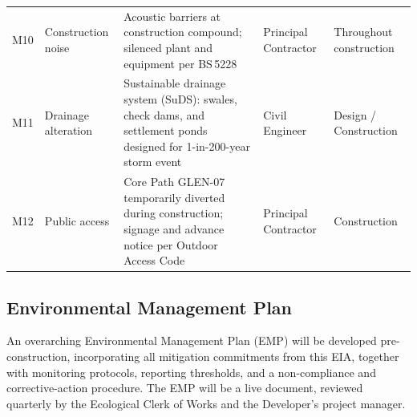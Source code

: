 \begin{tabularx}{\linewidth}{@{}c >{\raggedright\arraybackslash}p{2.4cm} >{\raggedright\arraybackslash}X >{\raggedright\arraybackslash}p{2.2cm} >{\raggedright\arraybackslash}p{2cm} @{}}
M10 & Construction noise & Acoustic barriers at construction compound; silenced plant and equipment per BS\,5228 & Principal Contractor & Throughout construction \\
\rowcolor{rowshade}
M11 & Drainage alteration & Sustainable drainage system (SuDS): swales, check dams, and settlement ponds designed for 1-in-200-year storm event & Civil Engineer & Design / Construction \\
M12 & Public access & Core Path GLEN-07 temporarily diverted during construction; signage and advance notice per Outdoor Access Code & Principal Contractor & Construction \\
\bottomrule
\end{tabularx}

\subsection{Environmental Management Plan}
An overarching Environmental Management Plan (EMP) will be developed pre-construction, incorporating all mitigation commitments from this EIA, together with monitoring protocols, reporting thresholds, and a non-compliance and corrective-action procedure. The EMP will be a live document, reviewed quarterly by the Ecological Clerk of Works and the Developer's project manager.

